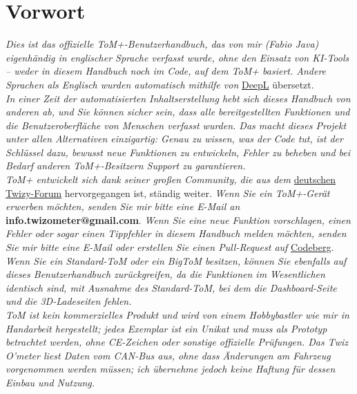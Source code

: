 \chapter*{Vorwort}

\textit{Dies ist das offizielle ToM+-Benutzerhandbuch, das von mir (Fabio Java) eigenhändig in englischer Sprache verfasst wurde, ohne den Einsatz
von KI-Tools – weder in diesem Handbuch noch im Code, auf dem ToM+ basiert. Andere Sprachen
als Englisch wurden automatisch mithilfe von} \href{https://www.deepl.com/en/translator}{DeepL} übersetzt.\\

\textit{In einer Zeit der automatisierten Inhaltserstellung hebt sich dieses Handbuch von anderen ab, und Sie können
sicher sein, dass alle bereitgestellten Funktionen und die Benutzeroberfläche von Menschen verfasst wurden.
Das macht dieses Projekt unter allen Alternativen einzigartig: Genau zu wissen,
was der Code tut, ist der Schlüssel dazu, bewusst neue Funktionen zu entwickeln, Fehler zu beheben und
bei Bedarf anderen ToM+-Besitzern Support zu garantieren.}\\

\textit{ToM+ entwickelt sich dank seiner großen Community, die aus dem} \href{https://www.twizy-forum.de/twiz-o-meter}{deutschen Twizy-Forum} hervorgegangen ist, ständig weiter. \textit{Wenn Sie 
ein ToM+-Gerät erwerben möchten, senden Sie mir bitte eine E-Mail an} \textbf{info.twizometer@gmail.com}.
\textit{Wenn Sie eine neue Funktion vorschlagen, einen Fehler oder sogar einen Tippfehler in diesem
Handbuch melden möchten, senden Sie mir bitte eine E-Mail oder erstellen Sie einen Pull-Request auf} \href{https://codeberg.org/fabio-java/ToM-Wizard}{Codeberg}.\\

\textit{Wenn Sie ein Standard-ToM oder ein BigToM besitzen, können Sie ebenfalls auf dieses Benutzerhandbuch zurückgreifen,
da die Funktionen im Wesentlichen identisch sind, mit Ausnahme des Standard-ToM, bei dem die Dashboard-Seite
und die 3D-Ladeseiten fehlen.}\\

\textit{ToM ist kein kommerzielles Produkt und wird von einem Hobbybastler wie mir in Handarbeit hergestellt; jedes 
Exemplar ist ein Unikat und muss als Prototyp betrachtet werden, ohne CE-Zeichen oder sonstige 
offizielle Prüfungen. Das Twiz O’meter liest Daten vom CAN-Bus aus, ohne dass
Änderungen am Fahrzeug vorgenommen werden müssen; ich übernehme jedoch keine Haftung für dessen Einbau
und Nutzung.}\\

